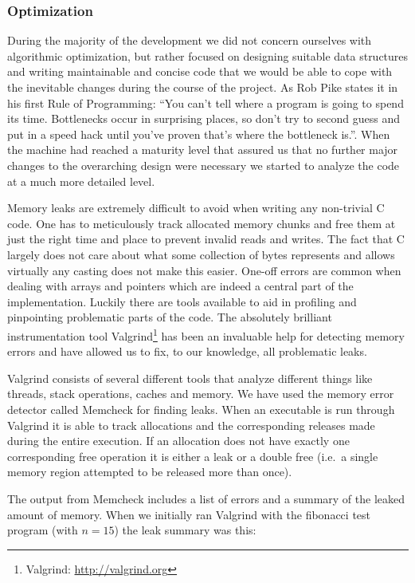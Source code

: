 \subsubsection{Optimization}

During the majority of the development we did not concern ourselves with
algorithmic optimization, but rather focused on designing suitable data
structures and writing maintainable and concise code that we would be able to
cope with the inevitable changes during the course of the project. As Rob Pike
states it in his first Rule of Programming: ``You can't tell where a program is
going to spend its time. Bottlenecks occur in surprising places, so don't try to
second guess and put in a speed hack until you've proven that's where the
bottleneck is.''\cite{pike-rules}. When the machine had reached a maturity level
that assured us that no further major changes to the overarching design were
necessary we started to analyze the code at a much more detailed level.

Memory leaks are extremely difficult to avoid when writing any non-trivial C
code. One has to meticulously track allocated memory chunks and free them at
just the right time and place to prevent invalid reads and writes. The fact that
C largely does not care about what some collection of bytes represents and
allows virtually any casting does not make this easier. One-off errors are
common when dealing with arrays and pointers which are indeed a central part of
the \thename{} implementation. Luckily there are tools available to aid in
profiling and pinpointing problematic parts of the code. The absolutely
brilliant instrumentation tool Valgrind\footnote{Valgrind:
  \url{http://valgrind.org}} has been an invaluable help for detecting memory
errors and have allowed us to fix, to our knowledge, all problematic leaks.

Valgrind consists of several different tools that analyze different things like
threads, stack operations, caches and memory. We have used the memory error
detector called Memcheck for finding leaks. When an executable is run through
Valgrind it is able to track allocations and the corresponding releases made
during the entire execution. If an allocation does not have exactly one
corresponding free operation it is either a leak or a double free (i.e.~a single
memory region attempted to be released more than once).

The output from Memcheck includes a list of errors and a summary of the leaked
amount of memory. When we initially ran Valgrind with the fibonacci test program
(with $n=15$) the leak summary was this:

